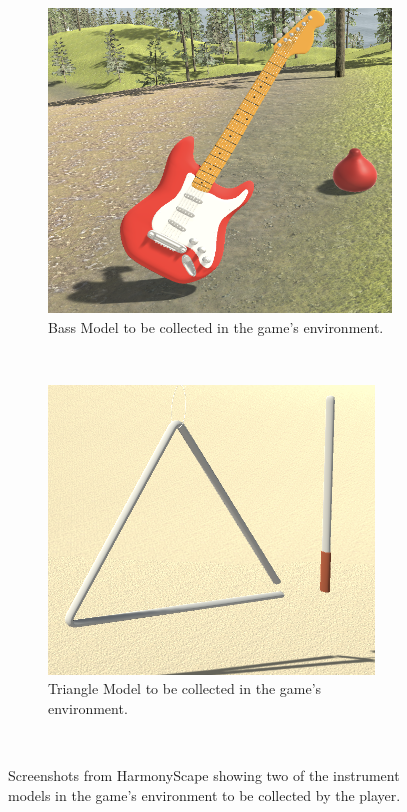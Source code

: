 \documentclass{l4proj}
\begin{document}
\begin{figure}[h]
    \centering
    \begin{subfigure}[b]{0.45\textwidth}
        \includegraphics[width=\textwidth]{dissertation/images/bass_model.png}
        \caption{Bass Model to be collected in the game's environment.}
        \label{fig:bass_model}
    \end{subfigure}
    ~ 
    \begin{subfigure}[b]{0.45\textwidth}
        \includegraphics[width=\textwidth]{dissertation/images/triangle_model.png}
        \caption{Triangle Model to be collected in the game's environment.}
        \label{fig:triangle_model}
    \end{subfigure}
    ~  
    \caption{Screenshots from HarmonyScape showing two of the instrument models in the game's environment to be collected by the player.
    }\label{fig:instrument_models}
\end{figure}
\end{document}
